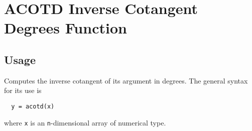 \section{ACOTD Inverse Cotangent Degrees Function}

\subsection{Usage}

Computes the inverse cotangent of its argument in degrees.  The general
syntax for its use is
\begin{verbatim}
  y = acotd(x)
\end{verbatim}
where \verb|x| is an \verb|n|-dimensional array of numerical type.
